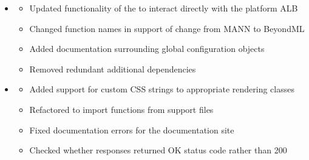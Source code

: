 \documentclass[letterpaper,10pt,english]{sphinxmanual}
\begin{document}
\begin{itemize}
\begin{description}
\begin{itemize}
\item {} 
\sphinxAtStartPar
Updated  class with parameters for  and 

\item {} 
\sphinxAtStartPar
Updated across\sphinxhyphen{}the\sphinxhyphen{}board functionality of the 

\end{itemize}

\end{description}

\item {} \begin{description}
\begin{itemize}
\item {} 
\sphinxAtStartPar
Updated functionality of the  to interact directly with the platform ALB

\item {} 
\sphinxAtStartPar
Changed function names in support of change from MANN to BeyondML

\item {} 
\sphinxAtStartPar
Added documentation surrounding global configuration objects

\item {} 
\sphinxAtStartPar
Removed redundant additional dependencies

\end{itemize}

\end{description}

\item {} \begin{description}
\begin{itemize}
\item {} 
\sphinxAtStartPar
Added support for custom CSS strings to appropriate rendering classes

\item {} 
\sphinxAtStartPar
Refactored  to import functions from support files

\item {} 
\sphinxAtStartPar
Fixed documentation errors for the documentation site

\item {} 
\sphinxAtStartPar
Checked whether responses returned OK status code rather than 200


\end{itemize}
\end{description}
\end{itemize}
\end{document}

